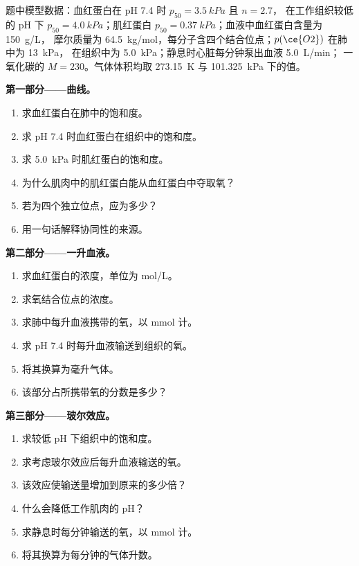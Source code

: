 \begin{problem}
\label{pb:b3:bioinorganic:1}
题中模型数据：血红蛋白在 pH 7.4 时 $p_{50} = \qty{3.5}{kPa}$ 且 $n = 2.7$，
在工作组织较低的 pH 下 $p_{50} = \qty{4.0}{kPa}$；肌红蛋白 $p_{50} = \qty{0.37}{kPa}$；血液中血红蛋白含量为 \qty{150}{g/L}，
摩尔质量为 \qty{64.5}{kg/mol}，每分子含四个结合位点；$p(\ce{O2})$ 在肺中为 \qty{13}{kPa}，
在组织中为 \qty{5.0}{kPa}；静息时心脏每分钟泵出血液 \qty{5.0}{L/min}；
一氧化碳的 $M = 230$。气体体积均取 \qty{273.15}{K} 与 \qty{101.325}{kPa} 下的值。

\medskip\noindent\textbf{第一部分——曲线。}
\begin{enumerate}
  \item 求血红蛋白在肺中的饱和度。
  \item 求 pH 7.4 时血红蛋白在组织中的饱和度。
  \item 求 \qty{5.0}{kPa} 时肌红蛋白的饱和度。
  \item 为什么肌肉中的肌红蛋白能从血红蛋白中夺取氧？
  \item 若为四个独立位点，应为多少？
  \item 用一句话解释协同性的来源。
\end{enumerate}

\medskip\noindent\textbf{第二部分——一升血液。}
\begin{enumerate}[resume]
  \item 求血红蛋白的浓度，单位为 mol/L。
  \item 求氧结合位点的浓度。
  \item 求肺中每升血液携带的氧，以 mmol 计。
  \item 求 pH 7.4 时每升血液输送到组织的氧。
  \item 将其换算为毫升气体。
  \item 该部分占所携带氧的分数是多少？
\end{enumerate}

\medskip\noindent\textbf{第三部分——玻尔效应。}
\begin{enumerate}[resume]
  \item 求较低 pH 下组织中的饱和度。
  \item 求考虑玻尔效应后每升血液输送的氧。
  \item 该效应使输送量增加到原来的多少倍？
  \item 什么会降低工作肌肉的 pH？
  \item 求静息时每分钟输送的氧，以 mmol 计。
  \item 将其换算为每分钟的气体升数。
\end{enumerate}


\end{problem}
